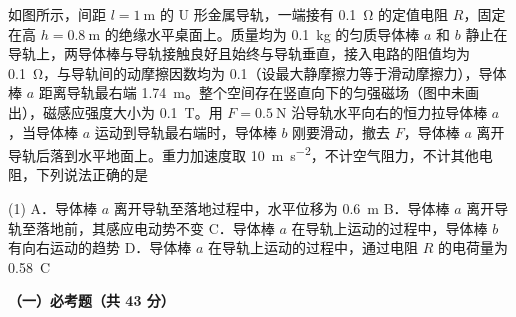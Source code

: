 \begin{question}
如图所示，间距 $l=\SI{1}{\metre}$ 的 U 形金属导轨，一端接有 \SI{0.1}{\ohm} 的定值电阻 $R$，固定在高 $h=\SI{0.8}{\metre}$ 的绝缘水平桌面上。质量均为 \SI{0.1}{\kilo\gram} 的匀质导体棒 $a$ 和 $b$ 静止在导轨上，两导体棒与导轨接触良好且始终与导轨垂直，接入电路的阻值均为 \SI{0.1}{\ohm}，与导轨间的动摩擦因数均为 0.1（设最大静摩擦力等于滑动摩擦力），导体棒 $a$ 距离导轨最右端 \SI{1.74}{\metre}。整个空间存在竖直向下的匀强磁场（图中未画出），磁感应强度大小为 \SI{0.1}{\tesla}。用 $F=\SI{0.5}{\newton}$ 沿导轨水平向右的恒力拉导体棒 $a$，当导体棒 $a$ 运动到导轨最右端时，导体棒 $b$ 刚要滑动，撤去 $F$，导体棒 $a$ 离开导轨后落到水平地面上。重力加速度取 \SI{10}{\metre\per\second\squared}，不计空气阻力，不计其他电阻，下列说法正确的是\gkblank


\begin{gkopts}(1)
  \task A．导体棒 $a$ 离开导轨至落地过程中，水平位移为 \SI{0.6}{\metre}
  \task B．导体棒 $a$ 离开导轨至落地前，其感应电动势不变
  \task C．导体棒 $a$ 在导轨上运动的过程中，导体棒 $b$ 有向右运动的趋势
  \task D．导体棒 $a$ 在导轨上运动的过程中，通过电阻 $R$ 的电荷量为 \SI{0.58}{\coulomb}
\end{gkopts}
\end{question}


\textbf{（一）必考题（共 43 分）}

